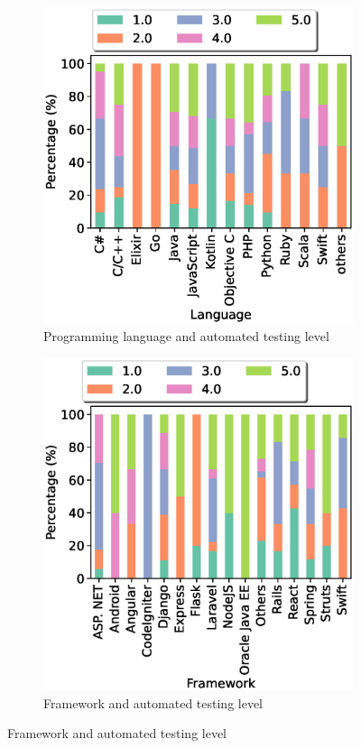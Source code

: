 \begin{figure}[t]
    \centering
    \caption{Analysis of automated testing level}
    \begin{subfigure}{0.45\textwidth}
        \includegraphics[scale=0.35]{Figures/Language_and_Test_Level}
          \caption{Programming language and automated testing level}
          \label{fig:language and autotest}
    \end{subfigure}
    \begin{subfigure}{0.45\textwidth}
          \includegraphics[scale=0.35]{Figures/Framework_and_Test_Level}
          \caption{Framework and automated testing level}
          \label{fig:framework and autotest}
    \end{subfigure}
\end{figure}


